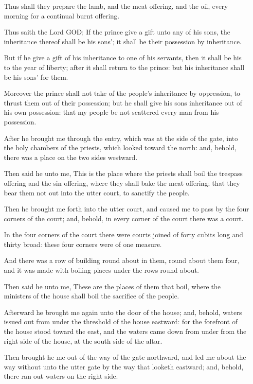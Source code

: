 \Verse Thus shall they prepare the lamb, and the meat offering, and the oil, every morning for a continual burnt offering.

\Verse Thus saith the Lord GOD; If the prince give a gift unto any of his sons, the inheritance thereof shall be his sons'; it shall be their possession by inheritance.

\Verse But if he give a gift of his inheritance to one of his servants, then it shall be his to the year of liberty; after it shall return to the prince: but his inheritance shall be his sons' for them.

\Verse Moreover the prince shall not take of the people's inheritance by oppression, to thrust them out of their possession; but he shall give his sons inheritance out of his own possession: that my people be not scattered every man from his possession.

\Verse After he brought me through the entry, which was at the side of the gate, into the holy chambers of the priests, which looked toward the north: and, behold, there was a place on the two sides westward.

\Verse Then said he unto me, This is the place where the priests shall boil the trespass offering and the sin offering, where they shall bake the meat offering; that they bear them not out into the utter court, to sanctify the people.

\Verse Then he brought me forth into the utter court, and caused me to pass by the four corners of the court; and, behold, in every corner of the court there was a court.

\Verse In the four corners of the court there were courts joined of forty cubits long and thirty broad: these four corners were of one measure.

\Verse And there was a row of building round about in them, round about them four, and it was made with boiling places under the rows round about.

\Verse Then said he unto me, These are the places of them that boil, where the ministers of the house shall boil the sacrifice of the people.


\Chapter
\Verse Afterward he brought me again unto the door of the house; and, behold, waters issued out from under the threshold of the house eastward: for the forefront of the house stood toward the east, and the waters came down from under from the right side of the house, at the south side of the altar.

\Verse Then brought he me out of the way of the gate northward, and led me about the way without unto the utter gate by the way that looketh eastward; and, behold, there ran out waters on the right side.


